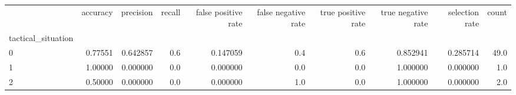 \begin{tabular}{lrrrrrrrrr}
\toprule
{} &  accuracy &  precision &  recall &  false positive rate &  false negative rate &  true positive rate &  true negative rate &  selection rate &  count \\
tactical\_situation &           &            &         &                      &                      &                     &                     &                 &        \\
\midrule
0                  &   0.77551 &   0.642857 &     0.6 &             0.147059 &                  0.4 &                 0.6 &            0.852941 &        0.285714 &   49.0 \\
1                  &   1.00000 &   0.000000 &     0.0 &             0.000000 &                  0.0 &                 0.0 &            1.000000 &        0.000000 &    1.0 \\
2                  &   0.50000 &   0.000000 &     0.0 &             0.000000 &                  1.0 &                 0.0 &            1.000000 &        0.000000 &    2.0 \\
\bottomrule
\end{tabular}
